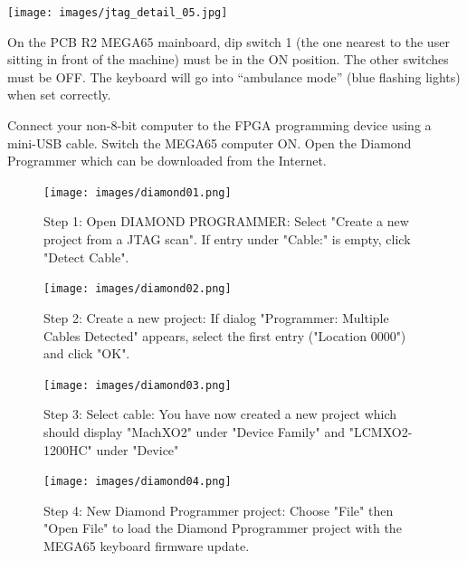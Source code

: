 \texttt{[image: images/jtag\_detail\_05.jpg]}


On the PCB R2 MEGA65 mainboard, dip switch 1 (the one nearest to the user
sitting in front of the machine) must be in the ON position. The other
switches must be OFF. The keyboard will go into ``ambulance mode''
(blue flashing lights) when set correctly.

Connect your non-8-bit computer to the FPGA programming device using a
mini-USB cable. Switch the MEGA65 computer ON. Open the Diamond Programmer
which can be downloaded from the Internet.

\begin{figure}[H]
  \centering
  \texttt{[image: images/diamond01.png]}
  \captionsetup{width=0.8\linewidth}
  \caption{Step 1: Open DIAMOND PROGRAMMER:
           Select "Create a new project from a JTAG scan". If entry
           under "Cable:" is empty, click "Detect Cable".}
  \label{fig:diamond01}

\vspace{5mm}

  \texttt{[image: images/diamond02.png]}
  \captionsetup{width=0.8\linewidth}
  \caption{Step 2: Create a new project:
           If dialog "Programmer: Multiple Cables Detected" appears,
           select the first entry ("Location 0000") and click "OK".}
  \label{fig:diamond02}
\end{figure}


\begin{figure}[H]
  \centering
  \texttt{[image: images/diamond03.png]}
  \captionsetup{width=0.8\linewidth}
  \caption{Step 3: Select cable:
           You have now created a new project which should display
           "MachXO2" under "Device Family" and "LCMXO2-1200HC" under "Device"}
  \label{fig:diamond03}

\vspace{5mm}

  \texttt{[image: images/diamond04.png]}
  \captionsetup{width=0.8\linewidth}
  \caption{Step 4: New Diamond Programmer project:
           Choose "File" then "Open File" to load the Diamond Pprogrammer
           project with the MEGA65 keyboard firmware update.}
  \label{fig:diamond04}
\end{figure}


